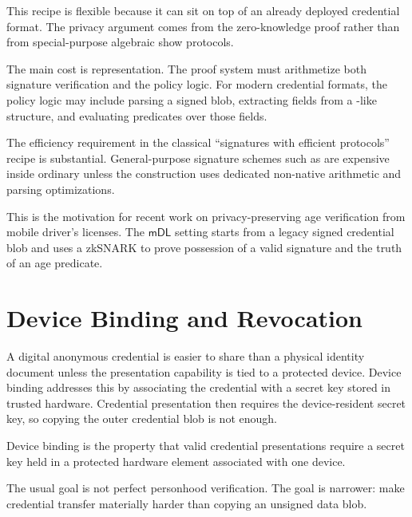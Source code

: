 \documentclass[11pt]{article}
\newcommand{\mDL}{\ensuremath{\mathsf{mDL}}}
\begin{document}
This recipe is flexible because it can sit on top of an already deployed
credential format.  The privacy argument comes from the zero-knowledge proof
rather than from special-purpose algebraic show protocols.

The main cost is representation.  The proof system must arithmetize both
signature verification and the policy logic.  For modern credential formats,
the policy logic may include parsing a signed blob, extracting fields from a
-like structure, and evaluating predicates over those fields.

\begin{remark}
The efficiency requirement in the classical ``signatures with efficient
protocols'' recipe is substantial.  General-purpose signature schemes such as
 are expensive inside ordinary  unless the construction
uses dedicated non-native arithmetic and parsing optimizations.
\end{remark}

This is the motivation for recent work on privacy-preserving age verification
from mobile driver's licenses.  The \mDL{} setting starts from a legacy signed
credential blob and uses a zkSNARK to prove possession of a valid signature and
the truth of an age predicate.

\section{Device Binding and Revocation}

A digital anonymous credential is easier to share than a physical identity
document unless the presentation capability is tied to a protected device.
Device binding addresses this by associating the credential with a secret key
stored in trusted hardware.  Credential presentation then requires the
device-resident secret key, so copying the outer credential blob is not enough.

\begin{definition}
Device binding is the property that valid credential presentations require a
secret key held in a protected hardware element associated with one device.
\end{definition}

The usual goal is not perfect personhood verification.  The goal is narrower:
make credential transfer materially harder than copying an unsigned data blob.
\end{document}
